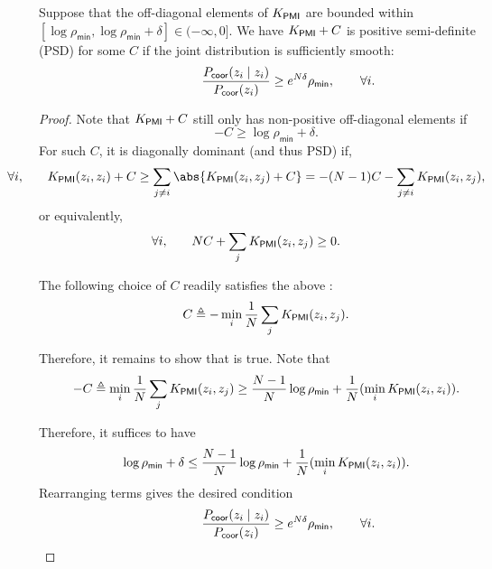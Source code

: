 \begin{proposition}\label{prop:kpmi-psd-scale}
    Suppose that the off-diagonal elements of $K_\mathsf{PMI}$ are bounded within $[\log \rho_\mathsf{min}, \log \rho_\mathsf{min} + \delta] \in (-\infty, 0]$. We have $K_\mathsf{PMI} + C$ is positive semi-definite (PSD) for some $C$ if the joint distribution is sufficiently smooth: \begin{equation}
        \frac{\PcoiCi}{\Pcoi} \geq e^{N \delta} \rho_\mathsf{min}\mathrlap{,\qquad \forall i.}
    \end{equation}
\end{proposition}

\begin{proof}

    Note that $K_\mathsf{PMI} +C$ still only has non-positive off-diagonal elements if \begin{equation}
        - C \geq \log \rho_\mathsf{min} + \delta. \label{eq:C-cond}
    \end{equation}
    For such $C$, it is diagonally dominant (and thus PSD) if, \begin{equation}
        \mathllap{\forall i,\qquad} \Kii +C \geq \sum_{j\neq i} \abs{\Kij + C} = - (N - 1) C - \sum_{j\neq i} \Kij,
    \end{equation}
    or equivalently, \begin{equation}
        \mathllap{\forall i,\qquad} NC + \sum_j \Kij \geq 0.\label{eq:diag-dom-sufficient}
    \end{equation}
    
    The following choice of $C$ readily satisfies the above : \begin{equation}
        C \triangleq -\min_i \frac{1}{N} \sum_j K_\mathsf{PMI}(z_i, z_j). 
    \end{equation}

    Therefore, it remains to show that  is true.  Note that \begin{equation}
        - C \triangleq \min_i \frac{1}{N} \sum_j K_\mathsf{PMI}(z_i, z_j) \geq \frac{N-1}{N} \log \rho_\mathsf{min} + \frac{1}{N} (\min_i K_\mathsf{PMI}(z_i, z_i)). 
    \end{equation}

    Therefore, it suffices to have \begin{equation}
        \log \rho_\mathsf{min} + \delta \leq \frac{N-1}{N}  \log \rho_\mathsf{min} + \frac{1}{N} (\min_i K_\mathsf{PMI}(z_i, z_i)). 
    \end{equation}
    Rearranging terms gives the desired condition \begin{equation}
    \frac{\PcoiCi}{\Pcoi} \geq e^{N \delta} \rho_\mathsf{min}\mathrlap{,\qquad \forall i.}
    \end{equation}
\end{proof}
